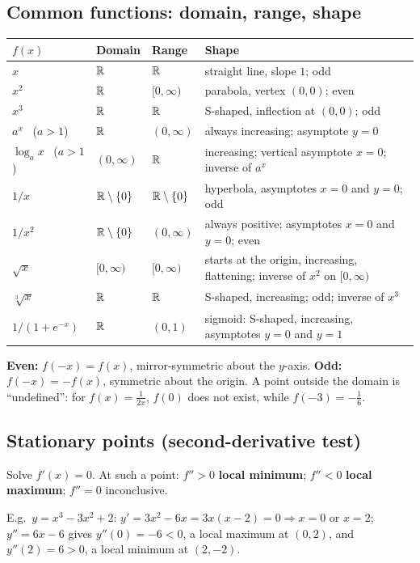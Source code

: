 \documentclass{fkt-notes}
\theoremstyle{definition}
\begin{document}
\subsection*{Common functions: domain, range, shape}
%
\begin{center}
  \small\renewcommand{\arraystretch}{1.35}
  \begin{tabular}{@{}lllp{}@{}}
    \toprule
    $f(x)$ & Domain & Range & Shape \\
    \midrule
    $x$ & $\mathbb{R}$ & $\mathbb{R}$ & straight line, slope $1$; odd \\
    $x^2$ & $\mathbb{R}$ & $[0,\infty)$ & parabola, vertex $(0,0)$; even \\
    $x^3$ & $\mathbb{R}$ & $\mathbb{R}$ & S-shaped, inflection at $(0,0)$; odd \\
    $a^x$ \ ($a>1$) & $\mathbb{R}$ & $(0,\infty)$ & always increasing; asymptote $y=0$ \\
    $\log_ax$ \ ($a>1$) & $(0,\infty)$ & $\mathbb{R}$ & increasing; vertical asymptote $x=0$; inverse of $a^x$ \\
    $1/x$ & $\mathbb{R}\setminus\{0\}$ & $\mathbb{R}\setminus\{0\}$ & hyperbola, asymptotes $x=0$ and $y=0$; odd \\
    $1/x^2$ & $\mathbb{R}\setminus\{0\}$ & $(0,\infty)$ & always positive; asymptotes $x=0$ and $y=0$; even \\
    $\sqrt x$ & $[0,\infty)$ & $[0,\infty)$ & starts at the origin, increasing, flattening; inverse of $x^2$ on $[0,\infty)$ \\
    $\sqrt[3]x$ & $\mathbb{R}$ & $\mathbb{R}$ & S-shaped, increasing; odd; inverse of $x^3$ \\
    $1/(1+e^{-x})$ & $\mathbb{R}$ & $(0,1)$ & sigmoid: S-shaped, increasing, asymptotes $y=0$ and $y=1$ \\
    \bottomrule
  \end{tabular}
\end{center}
\textbf{Even:} $f(-x)=f(x)$, mirror-symmetric about the $y$-axis.
\textbf{Odd:} $f(-x)=-f(x)$, symmetric about the origin.
A point outside the domain is ``undefined'': for $f(x)=\frac1{2x}$,
$f(0)$ does not exist, while $f(-3)=-\frac16$.

\subsection*{Stationary points (second-derivative test)}
%
\begin{rulepar}
  Solve $f'(x)=0$. At such a point: $f''>0$ \textbf{local minimum};
  $f''<0$ \textbf{local maximum}; $f''=0$ inconclusive.
\end{rulepar}
E.g.\ $y=x^3-3x^2+2$: $y'=3x^2-6x=3x(x-2)=0\Rightarrow x=0$ or $x=2$;
$y''=6x-6$ gives $y''(0)=-6<0$, a local maximum at $(0,2)$, and
$y''(2)=6>0$, a local minimum at $(2,-2)$.
\end{document}
